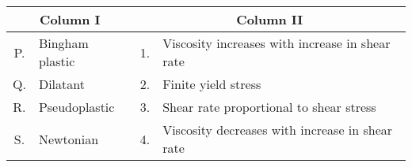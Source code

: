 \begin{center}
\begin{tabular}{|c|l|c|l|}
\hline
\multicolumn{2}{|c|}{\textbf{Column I}} & \multicolumn{2}{c|}{\textbf{Column II}} \\ \hline
P. & Bingham plastic & 1. & Viscosity increases with increase in shear rate\\
Q. & Dilatant        & 2. & Finite yield stress \\
R. & Pseudoplastic   & 3. & Shear rate proportional to shear stress \\
S. & Newtonian       & 4. & Viscosity decreases with increase in shear rate \\
\hline
\end{tabular}
\end{center}